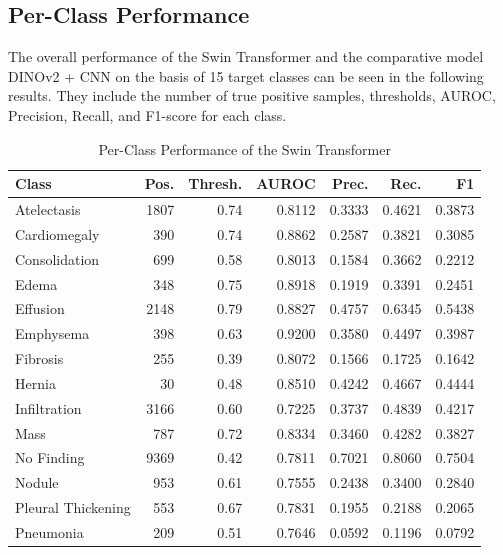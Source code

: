 \documentclass[conference]{IEEEtran}
\begin{document}
\subsection{Per-Class Performance}
The overall performance of the Swin Transformer and the comparative model 
DINOv2 + CNN on the basis of 15 target classes can be seen in the following results. They include the number of true positive samples, thresholds, AUROC, Precision, Recall, and F1-score for each class.
\begin{table}[t]
\centering
\begin{minipage}[b]{0.45\textwidth}
\centering
\caption{Per-Class Performance of the Swin Transformer}
\label{tab:per_class_performance_swin}
\renewcommand{\arraystretch}{1.1}
\setlength{\tabcolsep}{2.5pt}
\scriptsize
\begin{tabular}{lrrrrrr}
\hline
\textbf{Class} & \textbf{Pos.} & \textbf{Thresh.} & \textbf{AUROC} & \textbf{Prec.} & \textbf{Rec.} & \textbf{F1} \\
\hline
Atelectasis         & 1807 & 0.74 & 0.8112 & 0.3333 & 0.4621 & 0.3873 \\
Cardiomegaly        & 390  & 0.74 & 0.8862 & 0.2587 & 0.3821 & 0.3085 \\
Consolidation       & 699  & 0.58 & 0.8013 & 0.1584 & 0.3662 & 0.2212 \\
Edema               & 348  & 0.75 & 0.8918 & 0.1919 & 0.3391 & 0.2451 \\
Effusion            & 2148 & 0.79 & 0.8827 & 0.4757 & 0.6345 & 0.5438 \\
Emphysema           & 398  & 0.63 & 0.9200 & 0.3580 & 0.4497 & 0.3987 \\
Fibrosis            & 255  & 0.39 & 0.8072 & 0.1566 & 0.1725 & 0.1642 \\
Hernia              & 30   & 0.48 & 0.8510 & 0.4242 & 0.4667 & 0.4444 \\
Infiltration        & 3166 & 0.60 & 0.7225 & 0.3737 & 0.4839 & 0.4217 \\
Mass                & 787  & 0.72 & 0.8334 & 0.3460 & 0.4282 & 0.3827 \\
No Finding          & 9369 & 0.42 & 0.7811 & 0.7021 & 0.8060 & 0.7504 \\
Nodule              & 953  & 0.61 & 0.7555 & 0.2438 & 0.3400 & 0.2840 \\
Pleural Thickening  & 553  & 0.67 & 0.7831 & 0.1955 & 0.2188 & 0.2065 \\
Pneumonia           & 209  & 0.51 & 0.7646 & 0.0592 & 0.1196 & 0.0792 \\

\end{tabular}
\end{minipage}
\end{table}
\end{document}
